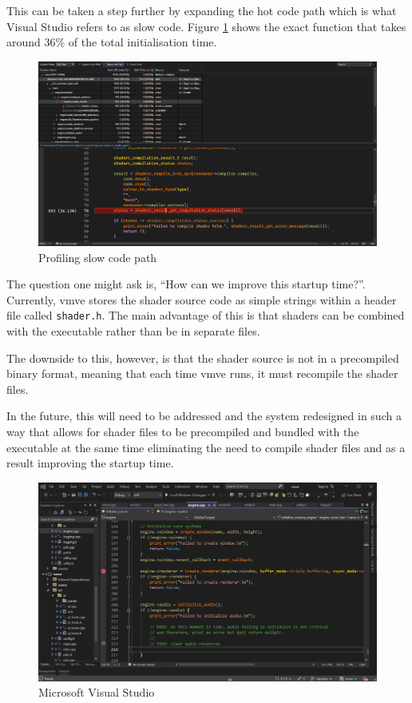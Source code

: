 \documentclass[11pt]{article}
\begin{document}
This can be taken a step further by expanding the hot code path which is what
Visual Studio refers to as slow code. Figure \ref{fig:vmve_slow_code_path} shows
the exact function that takes around 36\% of the total initialisation time.
\begin{figure}[H]
  \centering
  \includegraphics[width=\textwidth]{images/startup_profiling_slow_shader_compile.png}
  \caption{Profiling slow code path}
  \label{fig:vmve_slow_code_path}
\end{figure}

The question one might ask is, ``How can we improve this startup time?''.
Currently, \gls*{vmve} stores the shader source code as simple strings within a
header file called \lstinline{shader.h}. The main advantage of this is that
shaders can be combined with the executable rather than be in separate files.

The downside to this, however, is that the shader source is not in a precompiled
binary format, meaning that each time \gls*{vmve} runs, it must recompile the
shader files. 

In the future, this will need to be addressed and the system redesigned in such
a way that allows for shader files to be precompiled and bundled with the
executable at the same time eliminating the need to compile shader files and as
a result improving the startup time.


\begin{figure}[H]
  \centering
  \includegraphics[width=\textwidth]{images/visual_studio.png}
  \caption{Microsoft Visual Studio}
  \label{fig:visual_studio}
\end{figure}
\end{document}
